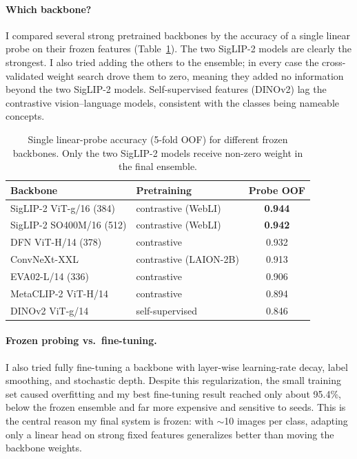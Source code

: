 \documentclass[11pt]{article}
\begin{document}
\paragraph{Which backbone?} I compared several strong pretrained backbones by the
accuracy of a single linear probe on their frozen features
(Table~\ref{tab:backbones}). The two SigLIP-2 models are clearly the strongest. I
also tried adding the others to the ensemble; in every case the cross-validated
weight search drove them to zero, meaning they added no information beyond the two
SigLIP-2 models. Self-supervised features (DINOv2) lag the contrastive
vision--language models, consistent with the classes being nameable concepts.

\begin{table}[t]
\centering
\caption{Single linear-probe accuracy (5-fold OOF) for different frozen backbones.
Only the two SigLIP-2 models receive non-zero weight in the final ensemble.}
\label{tab:backbones}
\begin{tabular}{llc}
\toprule
Backbone & Pretraining & Probe OOF \\
\midrule
SigLIP-2 ViT-g/16 (384) & contrastive (WebLI) & \textbf{0.944} \\
SigLIP-2 SO400M/16 (512) & contrastive (WebLI) & \textbf{0.942} \\
DFN ViT-H/14 (378) & contrastive & 0.932 \\
ConvNeXt-XXL & contrastive (LAION-2B) & 0.913 \\
EVA02-L/14 (336) & contrastive & 0.906 \\
MetaCLIP-2 ViT-H/14 & contrastive & 0.894 \\
DINOv2 ViT-g/14 & self-supervised & 0.846 \\
\bottomrule
\end{tabular}
\end{table}

\paragraph{Frozen probing vs.\ fine-tuning.} I also tried fully fine-tuning a
backbone with layer-wise learning-rate decay, label smoothing, and stochastic
depth. Despite this regularization, the small training set caused overfitting and
my best fine-tuning result reached only about 95.4\%, below the frozen ensemble
and far more expensive and sensitive to seeds. This is the central reason my final
system is frozen: with $\sim$10 images per class, adapting only a linear head on
strong fixed features generalizes better than moving the backbone weights.
\end{document}
